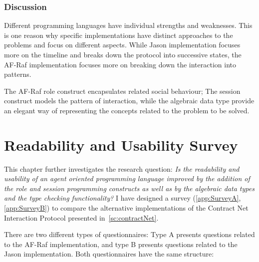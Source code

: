 \documentclass[a4paper,12pt,oneside,fleqn]{book} %
\begin{document}




\subsection{Discussion} %
Different programming languages have individual strengths and weaknesses.
This is one reason why specific implementations have distinct approaches to
the problems and focus on different aspects. While Jason implementation
focuses more on the timeline and breaks down the protocol into successive
states, the AF-Raf implementation focuses more on breaking down the
interaction into patterns.

The AF-Raf role construct encapsulates related social behaviour; The
session construct models the pattern of interaction, while the algebraic
data type provide an elegant way of representing the concepts related to
the problem to be solved. 
\chapter{Readability and Usability Survey}\label{ch:survey} %

This chapter further investigates the research question:
\textit{Is the readability and usability of an agent oriented programming
  language improved by the addition of the role and session programming
  constructs as well as by the algebraic data types and the type checking
functionality?} I have designed a survey (\autoref{app:SurveyA},
\autoref{app:SurveyB}) to compare the
alternative implementations of the Contract Net Interaction Protocol
presented in~\autoref{sc:contractNet}.

There are two different types of questionnaires: Type A presents questions
related to the AF-Raf implementation, and type B presents questions related
to the Jason implementation. Both questionnaires have the same structure:
\end{document}
